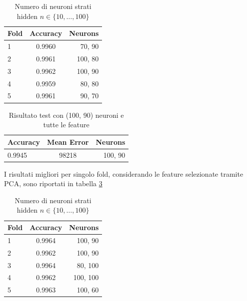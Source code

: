 \documentclass[12pt]{report}
\begin{document}
\begin{table}[H]
\begin{center}
\begin{tabular}{lcr}
\toprule
Fold & Accuracy & Neurons \\
\midrule
1 & 0.9960 & 70, 90\\
2 & 0.9961 & 100, 80\\
3 & 0.9962 & 100, 90\\
4 & 0.9959 & 80, 80\\
5 & 0.9961 & 90, 70\\
\bottomrule
\end{tabular}
\end{center}
\caption{Numero di neuroni strati hidden $n \in \{10, \dots, 100 \}$}
\label{keras_all_2h}
\end{table}

\begin{table}[H]
\begin{center}
\begin{tabular}{lcr}
\toprule
Accuracy & Mean Error & Neurons \\
\midrule
0.9945 & 98218 & 100, 90\\
\bottomrule
\end{tabular}
\end{center}
\caption{Risultato test con (100, 90) neuroni e tutte le feature}
\label{keras_all_test_2h}
\end{table}

I risultati migliori per singolo fold, considerando le feature selezionate tramite PCA, sono riportati in tabella \ref{keras_pca_2h}

\par\null\par
\begin{table}[H]
\begin{center}
\begin{tabular}{lcr}
\toprule
Fold & Accuracy & Neurons \\
\midrule
1 & 0.9964 & 100, 90\\
2 & 0.9962 & 100, 90\\
3 & 0.9964 & 80, 100\\
4 & 0.9962 & 100, 100\\
5 & 0.9963 & 100, 60\\
\bottomrule
\end{tabular}
\end{center}
\caption{Numero di neuroni strati hidden $n \in \{10, \dots, 100 \}$}
\label{keras_pca_2h}
\end{table}
\end{document}
